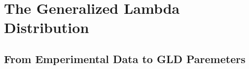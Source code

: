 \chapter[The Generalized Lambda Distribution]{The Generalized Lambda Distribution}\label{cap:gld}

\section{From Emperimental Data to GLD Paremeters}
\cite{Lampasi2006}
